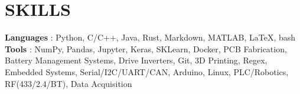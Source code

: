 \section{SKILLS}
\begin{itemize}[leftmargin=0in, label={}]
    \small{\item{
                    \textbf{Languages} {: Python, C/C++, Java, Rust, Markdown, MATLAB, \LaTeX, bash}\vspace{2pt} \\
                    \textbf{Tools}     {: NumPy, Pandas, Jupyter, Keras, SKLearn, Docker, PCB Fabrication, Battery Management Systems, Drive Inverters, Git, 3D Printing, Regex, Embedded Systems, Serial/I2C/UART/CAN, Arduino, Linux, PLC/Robotics, RF(433/2.4/BT), Data Acquisition}
              }}
\end{itemize}